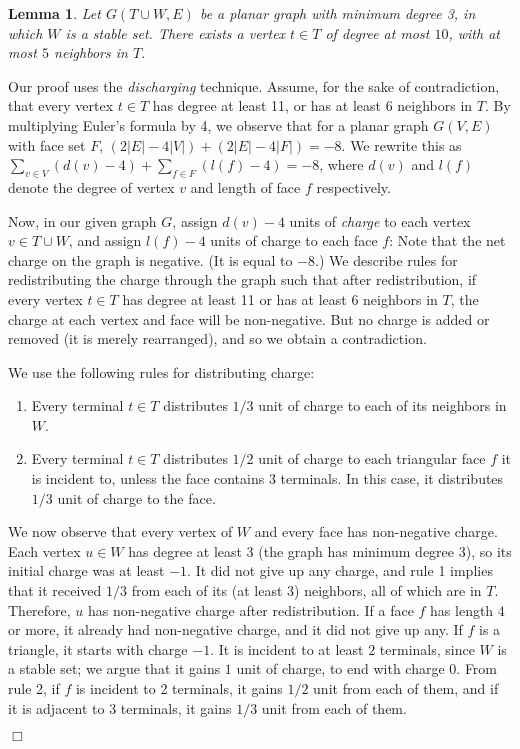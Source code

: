 \documentclass[11pt]{article}
\newtheorem{lemma}{Lemma}[section]
\renewenvironment{proof}{\vspace{-0.1in}\noindent{\bf Proof:}}{\hspace*{\fill}$\Box$\par}
\begin{document}
\begin{lemma}\label{lem:discharging}
  Let $G(T \cup W, E)$ be a planar graph with minimum degree 3, in
  which $W$ is a stable set. There exists a vertex $t \in T$ of
  degree at most $10$, with at most $5$ neighbors in $T$. 
\end{lemma}
\begin{proof}
  Our proof uses the \emph{discharging} technique. Assume, for the
  sake of contradiction, that every vertex $t \in T$ has degree at
  least 11, or has at least 6 neighbors in $T$. By multiplying Euler's
  formula by 4, we observe that for a planar graph $G(V,E)$ with face
  set $F$,  $(2|E| - 4|V|) + (2|E| - 4|F|) = -8$. We rewrite this as
  $\sum_{v \in V} \left(d(v) - 4 \right) + \sum_{f \in F} \left( l(f)
    - 4 \right) = -8$, where $d(v)$ and $l(f)$ denote the degree of
  vertex $v$ and length of face $f$ respectively.

  Now, in our given graph $G$, assign $d(v) - 4$ units of
  \emph{charge} to each vertex $v \in T \cup W$, and assign $l(f) - 4$
  units of charge to each face $f$: Note that the net charge on the
  graph is negative. (It is equal to $-8$.) We describe rules for
  redistributing the charge through the graph such that after
  redistribution, if every vertex $t \in T$ has degree at least 11 or
  has at least 6 neighbors in $T$, the charge at each vertex and face
  will be non-negative. But no charge is added or removed (it is merely
  rearranged), and so we obtain a contradiction.

  \bigskip \noindent
  We use the following rules for distributing charge:
  \begin{enumerate}
    \item Every terminal $t \in T$ distributes $1/3$ unit of charge to
      each of its neighbors in $W$.
    \item Every terminal $t \in T$ distributes $1/2$ unit of charge to
      each triangular face $f$ it is incident to, unless the face
      contains 3 terminals. In this case, it distributes $1/3$ unit of
      charge to the face.
  \end{enumerate}

  We now observe that every vertex of $W$ and every face has
  non-negative charge. Each vertex $u \in W$ has degree at least $3$
  (the graph has minimum degree $3$), so its initial charge was at
  least $-1$. It did not give up any charge, and rule 1 implies that
  it received $1/3$ from each of its (at least $3$) neighbors, all of
  which are in $T$. Therefore, $u$ has non-negative charge after
  redistribution. If a face $f$ has length $4$ or more, it already had
  non-negative charge, and it did not give up any. If $f$ is a
  triangle, it starts with charge $-1$. It is incident to at least $2$
  terminals, since $W$ is a stable set; we argue that it gains $1$
  unit of charge, to end with charge $0$. From rule 2, if $f$ is
  incident to 2 terminals, it gains $1/2$ unit from each of them, and
  if it is adjacent to $3$ terminals, it gains $1/3$ unit from each of
  them. 


\end{proof}
\end{document}
